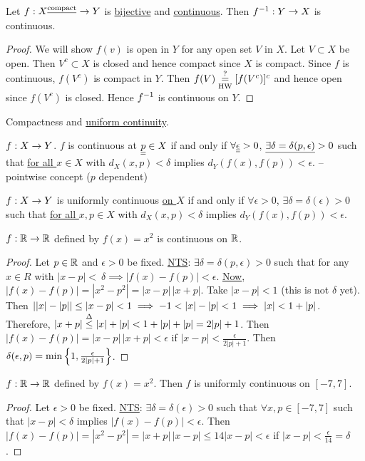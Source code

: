 \documentclass[]{article}
\begin{document}
\begin{theorem}
	\label{thm-4-17}
	Let $f:X^\text{\underline{compact}}\rightarrow Y$ is \ul{bijective} and \ul{continuous}.
	Then $f^{-1}:Y\rightarrow X$ is continuous.
\end{theorem}
\begin{proof}
	We will show $f(v)$ is open in $Y$ for any open set $V$ in $X$.
	Let $V\subset X$ be open.
	Then $V^c\subset X$ is closed and hence compact since $X$ is compact.
	Since $f$ is continuous, $f(V^c)$ is compact in $Y$.
	Then $f(V) \underset{\text{HW}}{\overset{?}{=}} [f(V^c)]^c$ and hence open since $f(V^c)$ is closed.
	Hence $f^{-1}$ is continuous on $Y$.
\end{proof}

Compactness and \ul{uniform continuity}.
\begin{recall}
	$f:X\rightarrow Y$. $f$ is continuous at $\underline{\underline{p}}\in X$ if and only if $\forall\underline{\underline{\epsilon}}>0$, $\underline{\exists\delta = \delta(p,\epsilon)}>0$ such that \ul{for all $x\in X$} with $d_X(x,p)<\delta$ implies $d_Y(f(x),f(p))<\epsilon$. 
	-- pointwise concept ($p$ dependent)
\end{recall}
\begin{definition}
	$f:X\rightarrow Y$ is uniformly continuous \ul{on $X$} if and only if $\forall\epsilon>0$, $\exists\delta=\delta(\epsilon)>0$ such that \ul{for all $x,p\in X$} with $d_X(x,p)<\delta$ implies $d_Y(f(x),f(p))<\epsilon$.
\end{definition}
\begin{example}
	$f:\mathbb{R}\rightarrow\mathbb{R}$ defined by $f(x) = x^2$ is continuous on $\mathbb{R}$.
\end{example}
\begin{proof}
	Let $p\in\mathbb{R}$ and $\epsilon>0$ be fixed.
	\ul{NTS}: $\exists\delta=\delta(p,\epsilon)>0$ such that for any $x\in R$ with $|x-p|<~\delta\implies |f(x)-f(p)|<\epsilon$.
	\ul{Now}, $|f(x)-f(p)| = |x^2-p^2| = |x-p|\,|x+p|$.
	Take $|x-p|< 1$ (this is not $\delta$ yet).
	Then $\left||x|-|p|\right|\leq|x-p|<1 \implies -1 < |x|-|p|<1 \implies |x| < 1+|p|$.
	Therefore, $|x+p|\overset{\Delta}{\leq}|x|+|p| < 1+|p|+|p| = 2|p|+1$.
	Then $|f(x)-f(p)| = |x-p|\,|x+p|<\epsilon$ if $|x-p|<\frac\epsilon{2|p|+1}$.
	Then $\delta(\epsilon,p) = \min\left\{ 1,\frac\epsilon{2|p|+1} \right\}$. 
\end{proof}
\begin{example}
	$f:\mathbb{R}\rightarrow\mathbb{R}$ defined by $f(x) = x^2$. Then $f$ is uniformly continuous on $[-7,7]$.
\end{example}
\begin{proof}
	Let $\epsilon>0$ be fixed.
	\ul{NTS}: $\exists \delta = \delta(\epsilon)>0$ such that $\forall x,p\in [-7,7]$ such that $|x-p|<\delta$ implies $|f(x)-f(p)|<\epsilon$.
	Then $|f(x)-f(p)| = |x^2-p^2| = |x+p|\,|x-p| \leq 14|x-p|<\epsilon$ if $|x-p|<\frac\epsilon{14}=\delta$.
\end{proof}
\end{document}
